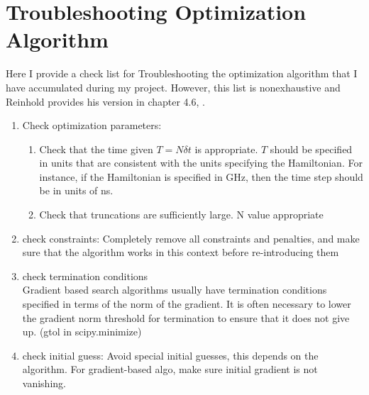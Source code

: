 \documentclass[12pt]{report}
\begin{document}
\section{Troubleshooting Optimization Algorithm}
Here I provide a check list for Troubleshooting the optimization algorithm that I have accumulated during my project. 
However, this list is nonexhaustive and Reinhold provides his version in chapter 4.6, \cite{reinhold2019}.
\begin{enumerate}
    \item Check optimization parameters: 
        \begin{enumerate}
            \item Check that the time given $T = N \delta t$ is appropriate.
                $T$ should be specified in units that are consistent with the units specifying the Hamiltonian. For instance, if the Hamiltonian is specified in GHz, then the time step should be in units of ns.
            \item Check that truncations are sufficiently large. N value appropriate
        \end{enumerate}
    \item check constraints: Completely remove all constraints and penalties, and make sure that the algorithm works in this context before re-introducing them
    \item check termination conditions \\
        Gradient based search algorithms usually have termination conditions specified in terms of the norm of the gradient. 
        It is often necessary to lower the gradient norm threshold for termination to ensure that it does not give up. (gtol in scipy.minimize)
    \item check initial guess: Avoid special initial guesses, this depends on the algorithm. 
        For gradient-based algo, make sure initial gradient is not vanishing.
\end{enumerate}

\end{document}
